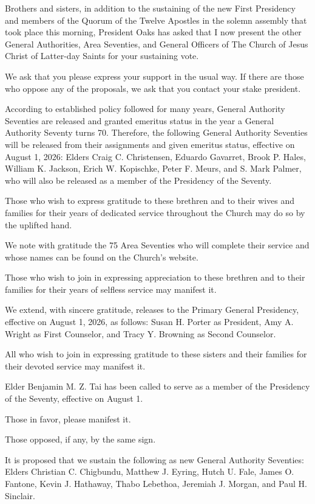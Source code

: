 \documentclass[letterpaper, 11pt]{report}
\begin{document}
Brothers and sisters, in addition to the sustaining of the new First Presidency and members of the Quorum of the Twelve Apostles in the solemn assembly that took place this morning, President Oaks has asked that I now present the other General Authorities, Area Seventies, and General Officers of The Church of Jesus Christ of Latter-day Saints for your sustaining vote.

We ask that you please express your support in the usual way. If there are those who oppose any of the proposals, we ask that you contact your stake president.

According to established policy followed for many years, General Authority Seventies are released and granted emeritus status in the year a General Authority Seventy turns 70. Therefore, the following General Authority Seventies will be released from their assignments and given emeritus status, effective on August 1, 2026: Elders Craig C. Christensen, Eduardo Gavarret, Brook P. Hales, William K. Jackson, Erich W. Kopischke, Peter F. Meurs, and S. Mark Palmer, who will also be released as a member of the Presidency of the Seventy.

Those who wish to express gratitude to these brethren and to their wives and families for their years of dedicated service throughout the Church may do so by the uplifted hand.

We note with gratitude the 75 Area Seventies who will complete their service and whose names can be found on the Church’s website.

Those who wish to join in expressing appreciation to these brethren and to their families for their years of selfless service may manifest it.

We extend, with sincere gratitude, releases to the Primary General Presidency, effective on August 1, 2026, as follows: Susan H. Porter as President, Amy A. Wright as First Counselor, and Tracy Y. Browning as Second Counselor.

All who wish to join in expressing gratitude to these sisters and their families for their devoted service may manifest it.

Elder Benjamin M. Z. Tai has been called to serve as a member of the Presidency of the Seventy, effective on August 1.

Those in favor, please manifest it.

Those opposed, if any, by the same sign.

It is proposed that we sustain the following as new General Authority Seventies: Elders Christian C. Chigbundu, Matthew J. Eyring, Hutch U. Fale, James O. Fantone, Kevin J. Hathaway, Thabo Lebethoa, Jeremiah J. Morgan, and Paul H. Sinclair.
\end{document}
